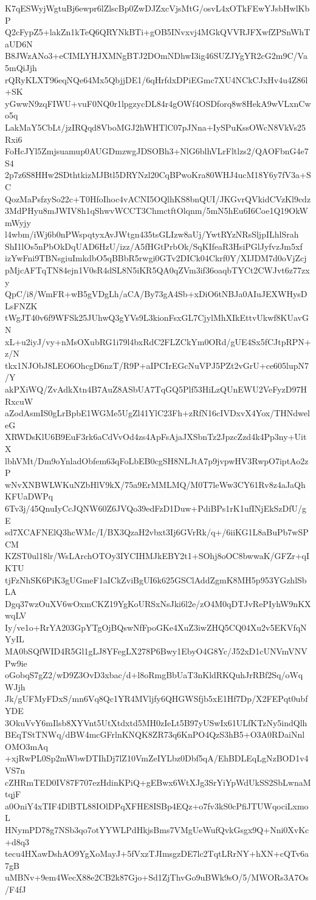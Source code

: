 K7qESWyjWgtuBj6ewpr6lZlscBp0ZwDJZxcVjsMtG/osvL4xOTkFEwYJsbHwlKbP
Q2cFypZ5+lakZn1kTeQ6QRYNkBTi+gOB5INvxvj4MGkQVVRJFXwfZPSnWhTaUD6N
B8JWzANo3+eCIMLYHJXMNgBTJ2DOmNDhwI3ig46SUZJYgYR2cG2m9C/Va5mQiJjh
rQRyKLXT96eqNQe64Mx5QbjjDE1/6qHrfdxDPiEGmc7XU4NCkCJxHv4u4Z86l+SK
yGwwN9zqFIWU+vuF0NQ0r1lpgzycDL84r4gOWf4OSDforq8w8HekA9wVLxnCwo5q
LakMaY5CbLt/jzIRQqd8VboMGJ2hWHTlC07pJNna+IySPuKssOWcN8VkVs25Rxi6
FoHcJYl5Zmjsuamup0AUGDmzwgJDSOBh3+NlG6blhVLrFltlzs2/QAOFbnG4e7S4
2p7z6S8HHw2SDthtkizMJBtl5DRYNzl20CqBPwoKra80WHJ4ucM18Y6y7fV3a+SC
QozMaPsfzySo22c+T0HfoIhoc4vACNI5OQlhKS8bnQUI/JKGvrQVkidCVzKl9cdz
3MdPHyu8mJWIV8h1qShwvWCCT3ChmctftOlqnm/5mN5hEu6I6Coe1Q19OkWmWyjy
l4wbm/iWj6b0nPWspqtyxAvJWtgn435tsGLIzw8aUj/YwtRYzNRsSljpILhlSrah
ShI1lOs5nPbOkDqUAD6HzU/izz/A5fHGtPrbOk/SqKIfeaR3HsiPGlJyfvzJm5xf
izYwFni9TBNsgiuImkdbO5qBBbR5rwgi0GTv2DICk04Ckrf0Y/XIJDM7d0oVjZcj
pMjcAFTqTN84ejn1V0sR4dSL8N5iKR5QA0qZVm3if36oaqbTYCt2CWJvt6z77zxy
QpC/i8/WmFR+wB5gVDgLh/aCA/By73gA4Sb+xDiO6tNBJa0AIuJEXWHysDLsFNZK
tWgJT40v6f9WFSk25JUhwQ3gYVs9L3kionFsxGL7CjylMhXIkEttvUkwf8KUavGN
xL+u2iyJ/vy+nMsOXubRG1i79l4bxRdC2FLZCkYm0ORd/gUE4Sx5fCJtpRPN+z/N
tkx1NJObJ8LEO6OhcgD6nzT/R9P+aIPCIrEGcNuVPJ5PZt2vGrU+ce605lupN7/Y
akPXiWQ/ZvAdkXtn4B7AuZ8ASbUA7TqGQ5Plf53HiLzQUnEWU2VeFyzD97HRxcuW
aZodAsmIS0gLrBpbE1WGMe5UgZl41YlC23Fh+zRfN16cIVDxvX4Yox/THNdweleG
XRWDsKlU6B9EuF3rk6aCdVvOd4zs4ApFsAjaJXSbnTz2JpzcZzd4k4Pp3ny+UitX
lbhVMt/Dm9oYnladObfem63qFoLbEB0cgSH8NLJtA7p9jvpwHV3RwpO7iptAo2zP
wNvXNBWLWKuNZbHlV9kX/75a9ErMMLMQ/M0T7leWw3CY61Rv8z4aJaQhKFUaDWPq
6Tv3j/45QnuIyCcJQNW60Z6JVQo39edFzD1Duw+PdiBPs1rK1ufINjEkSzDfU/gE
sd7XCAFNElQ3hcWMc/I/BX3QzaH2vbxt3Ij6GVrRk/q+/6iiKG1L8aBuPb7wSPCM
KZST0ul18lr/WsLArchOTOy3IYCIHMJkEBY2t1+SOhj8oOC8bwwaK/GFZr+qIKTU
tjFzNhSK6PiK3gUGmeF1aICkZviBgUI6k625GSClAddZgmK8MH5p953YGzhlSbLA
Dgq37wzOuXV6wOxmCKZ19YgKoURSxNsJki6l2e/zO4M0qDTJvRePIyhW9nKXwqLV
Iy/ve1o+RrYA203GpYTgOjBQswNfFpoGKe4XuZ3iwZHQ5CQ04Xu2v5EKVfqNYyIL
MA0bSQfWID4R5Gl1gLJ8YFegLX278P6Bwy1EbyO4G8Yc/J52xD1cUNVmVNVPw9ie
oGobqS7gZ2/wD9Z3OvD3xbac/d+l8oRmgBbUaT3nKldRKQuhJrRBf2Sq/oWqWJjh
Jk/gUFMyFDxS/mn6Vq8Qc1YR4MVljfy6QHGWSfjb5xE1Hf7Dp/X2FEPqt0ubfYDE
3OkuVvY6mIlsb8XYVnt5UtXtdxtd5MH0zIeLt5B97yUSwIx61ULfKTzNy5indQlh
BEqTStTNWq/dBW4mcGFrlnKNQK8ZR73q6KnPO4QzS3hB5+O3A0RDaiNnlOMO3mAq
+xjRwPL0Sp2mWbwDTIhDj7lZ10VmZeIYLbz0Dbf5qA/EhBDLEqLgNzBOD1v4VS7n
cZHRmTED0IV87F707ezHdinKPiQ+gEBwx6WtXJg3SrYiYpWdUkSS2SbLwnaMtqjF
a0OniY4xTIF4DlBTL88IOlDPqXFHE8ISBp4EQz+o7fv3kS0cPfiJTUWqociLxmoL
HNymPD78g7NSb3qo7otYYWLPdHkjsBms7VMgUeWufQvkGsgx9Q+Nni0XvKc+d8q3
tecu4HXawDshAO9YgXoMayJ+5fVxzTJImsgzDE7lc2TqtLRrNY+hXN+cQTv6a7gB
uMBNv+9em4WecX88e2CB2k87Gjo+Sd1ZjThvGo9uBWk9sO/5/MWORs3A7Os/F4fJ
